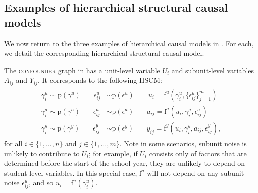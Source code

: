 \documentclass[12pt]{article}
\newcommand{\pr}{\mathrm{p}}
\newcommand{\f}{\mathrm{f}}
\begin{document}
\subsection{Examples of hierarchical structural causal models}



We now return to the three examples of hierarchical causal models in . For each, we detail the corresponding hierarchical structural causal model.

The \textsc{confounder} graph in  has a unit-level variable $U_i$ and subunit-level variables $A_{ij}$ and $Y_{ij}$. It corresponds to the following HSCM:
\begin{align}
  \label{eqn:ex-hscm}
\begin{split}
\gamma_i^{u} \sim \pr(\gamma^{u}) \,\,\,\,\,\,\,\,\,\,\,\epsilon_{ij}^{u} &\sim \pr(\epsilon^{u})\,\,\,\,\,\,\,\,\,\,\,\,u_i = \f^u(\gamma_i^{u}, \{\epsilon_{ij}^u\}_{j=1}^m)\\
\gamma_i^{a} \sim \pr(\gamma^{a}) \,\,\,\,\,\,\,\,\,\,\,\epsilon_{ij}^{a} &\sim \pr(\epsilon^{a}) \,\,\,\,\,\,\,\,\,\,\, a_{ij} = \f^a(u_i, \gamma^{a}_i, \epsilon_{ij}^{a})\\
\gamma_i^{y} \sim \pr(\gamma^{y}) \,\,\,\,\,\,\,\,\,\,\, \epsilon_{ij}^{y} &\sim \pr(\epsilon^{y}) \,\,\,\,\,\,\,\,\,\,\, y_{ij} = \f^y(u_i, \gamma_i^{y}, a_{ij}, \epsilon_{ij}^{y}),
\end{split}
\end{align}
for all $i \in \{1, \ldots, n\}$ and $j \in \{1, \ldots, m\}$.  Note in some scenarios, subunit noise is unlikely to contribute to $U_i$; for example, if $U_i$ consists only of factors that are determined before the start of the school year, they are unlikely to depend on student-level variables.  In this special case, $\f^u$ will not depend on any subunit noise $\epsilon_{ij}^u$, and so $u_i = \f^u(\gamma_i^u)$.
\end{document}
